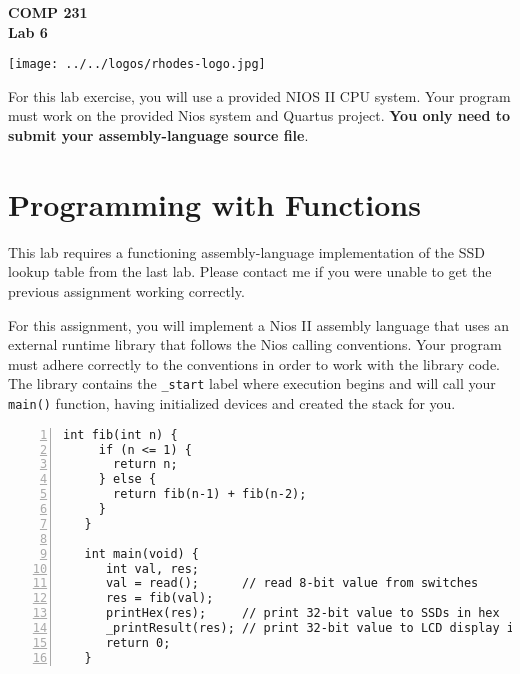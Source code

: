 \documentclass[10pt]{article}
\begin{document}
\hspace{-5mm}
\begin{minipage}{0.65\linewidth}
  \textbf{{\Large COMP 231\\Lab 6}}
\end{minipage}
\begin{minipage}{0.35\linewidth}
  \texttt{[image: ../../logos/rhodes-logo.jpg]}
\end{minipage}

\vspace{.5in}

\noindent For this lab exercise, you will use a provided NIOS II CPU
system. Your program must work on the provided Nios system and Quartus
project. {\bf You only need to submit your assembly-language source
file}.\\



\section*{Programming with Functions}

This lab requires a functioning assembly-language implementation of
the SSD lookup table from the last lab. Please contact me if you were
unable to get the previous assignment working correctly.

For this assignment, you will implement a Nios II assembly language that uses
an external runtime library that follows the Nios calling conventions. Your
program must adhere correctly to the conventions in order to work with the
library code. The library contains the {\tt \_start} label where execution
begins and will call your {\tt main()} function, having initialized devices and
created the stack for you.

\begin{lstlisting}[xleftmargin=.05\textwidth,linewidth=.9\textwidth,numbers=left,frame=single,float=htbp,captionpos=b]
   int fib(int n) {
     if (n <= 1) {
       return n;
     } else {
       return fib(n-1) + fib(n-2);
     }
   }

   int main(void) {
      int val, res;
      val = read();      // read 8-bit value from switches
      res = fib(val);
      printHex(res);     // print 32-bit value to SSDs in hex
      _printResult(res); // print 32-bit value to LCD display in decimal
      return 0;
   }
\end{lstlisting}
\end{document}
